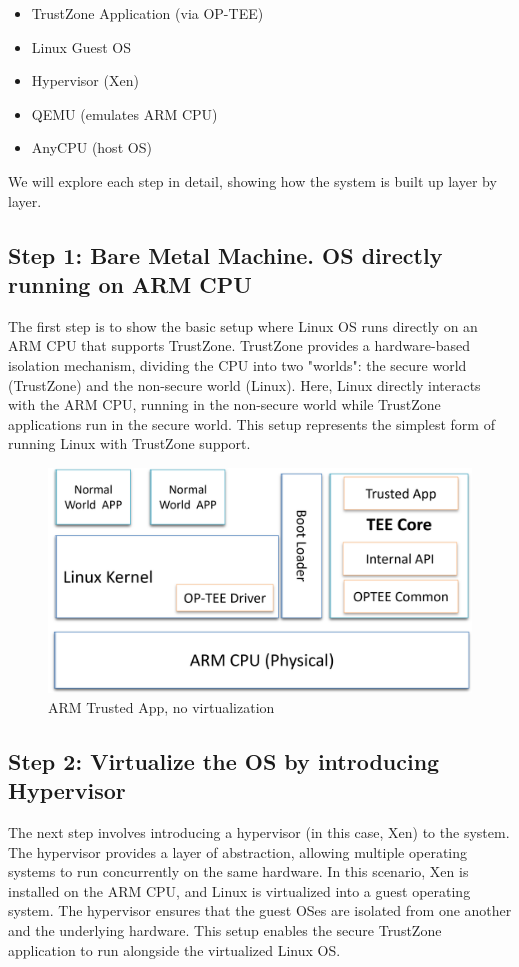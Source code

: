 \documentclass[acmtog]{acmart}
\begin{document}
\begin{itemize}
    \item TrustZone Application (via OP-TEE)
    \item Linux Guest OS
    \item Hypervisor (Xen)
    \item QEMU (emulates ARM CPU)
    \item AnyCPU (host OS)
\end{itemize}

We will explore each step in detail, showing how the system is built up layer by layer.

\subsection{Step 1: Bare Metal Machine. OS directly running on ARM CPU}

The first step is to show the basic setup where Linux OS runs directly on an ARM CPU that supports TrustZone. TrustZone provides a hardware-based isolation mechanism, dividing the CPU into two "worlds": the secure world (TrustZone) and the non-secure world (Linux). Here, Linux directly interacts with the ARM CPU, running in the non-secure world while TrustZone applications run in the secure world. This setup represents the simplest form of running Linux with TrustZone support.

\begin{figure}[ht]
  \centering
  \includegraphics[width=\columnwidth]{images/1.png}
  \caption{ARM Trusted App, no virtualization}
  \label{fig:image_label}
\end{figure}



\subsection{Step 2: Virtualize the OS by introducing Hypervisor}
The next step involves introducing a hypervisor (in this case, Xen) to the system. The hypervisor provides a layer of abstraction, allowing multiple operating systems to run concurrently on the same hardware. In this scenario, Xen is installed on the ARM CPU, and Linux is virtualized into a guest operating system. The hypervisor ensures that the guest OSes are isolated from one another and the underlying hardware. This setup enables the secure TrustZone application to run alongside the virtualized Linux OS.
\end{document}
